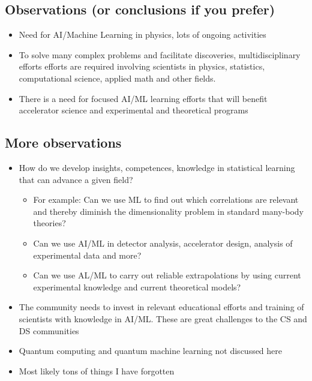 \documentclass[%
oneside,                 %
final,                   %
10pt]{article}
\begin{document}
\subsection{Observations (or conclusions if you prefer)}
\begin{block}{}
\begin{itemize}
\item Need for AI/Machine Learning in physics, lots of ongoing activities

\item To solve many complex problems and facilitate discoveries, multidisciplinary efforts efforts are required involving scientists in  physics, statistics, computational science, applied math and other fields.

\item There is a need for  focused AI/ML learning efforts that will benefit accelerator science and experimental and theoretical programs
\end{itemize}

\noindent
\end{block}

\subsection{More observations}
\begin{block}{}
\begin{itemize}
\item How do we develop insights, competences, knowledge in statistical learning that can advance a given field?
\begin{itemize}

  \item For example: Can we use ML to find out which correlations are relevant and thereby diminish the dimensionality problem in standard many-body  theories?

  \item Can we use AI/ML in detector analysis, accelerator design, analysis of experimental data and more?

  \item Can we use AL/ML to carry out reliable extrapolations by using current experimental knowledge and current theoretical models?

\end{itemize}

\noindent
\item The community needs to invest in relevant educational efforts and training of scientists with knowledge in AI/ML. These are great challenges to the CS and DS communities

\item Quantum computing and quantum machine learning not discussed here

\item Most likely tons of things I have forgotten
\end{itemize}

\noindent
\end{block}
\end{document}
